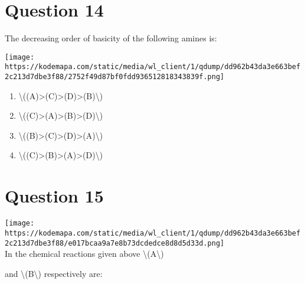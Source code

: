 \documentclass{article}
\begin{document}
\section*{Question 14}
The decreasing order of basicity of the following amines is:



\texttt{[image: https://kodemapa.com/static/media/wl\_client/1/qdump/dd962b43da3e663bef2c213d7dbe3f88/2752f49d87bf0fdd936512818343839f.png]}\\


\begin{enumerate}[label=(\alph*)]
\item \textbackslash((A)\textgreater(C)\textgreater(D)\textgreater(B)\textbackslash)


\item \textbackslash((C)\textgreater(A)\textgreater(B)\textgreater(D)\textbackslash)


\item \textbackslash((B)\textgreater(C)\textgreater(D)\textgreater(A)\textbackslash)


\item \textbackslash((C)\textgreater(B)\textgreater(A)\textgreater(D)\textbackslash)


\end{enumerate}
\newpage
\section*{Question 15}
\texttt{[image: https://kodemapa.com/static/media/wl\_client/1/qdump/dd962b43da3e663bef2c213d7dbe3f88/e017bcaa9a7e8b73dcdedce8d8d5d33d.png]}\\



In the chemical reactions given above \textbackslash(A\textbackslash)

and \textbackslash(B\textbackslash) respectively are:
\end{document}
